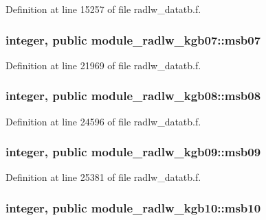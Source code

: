 Definition at line 15257 of file radlw\+\_\+datatb.\+f.

\subsubsection[{\texorpdfstring{msb07}{msb07}}]{\setlength{\rightskip}{0pt plus 5cm}integer, public module\+\_\+radlw\+\_\+kgb07\+::msb07}\hypertarget{group__module__radlw__main_gabba2139dfc5d8551f844f3809c28ce3c}{}\label{group__module__radlw__main_gabba2139dfc5d8551f844f3809c28ce3c}


Definition at line 21969 of file radlw\+\_\+datatb.\+f.

\subsubsection[{\texorpdfstring{msb08}{msb08}}]{\setlength{\rightskip}{0pt plus 5cm}integer, public module\+\_\+radlw\+\_\+kgb08\+::msb08}\hypertarget{group__module__radlw__main_ga3dd391fcce47d3aca3512bbfd946807b}{}\label{group__module__radlw__main_ga3dd391fcce47d3aca3512bbfd946807b}


Definition at line 24596 of file radlw\+\_\+datatb.\+f.

\subsubsection[{\texorpdfstring{msb09}{msb09}}]{\setlength{\rightskip}{0pt plus 5cm}integer, public module\+\_\+radlw\+\_\+kgb09\+::msb09}\hypertarget{group__module__radlw__main_ga7e6bb7acb0df29586d0bd52f3fc41d90}{}\label{group__module__radlw__main_ga7e6bb7acb0df29586d0bd52f3fc41d90}


Definition at line 25381 of file radlw\+\_\+datatb.\+f.

\subsubsection[{\texorpdfstring{msb10}{msb10}}]{\setlength{\rightskip}{0pt plus 5cm}integer, public module\+\_\+radlw\+\_\+kgb10\+::msb10}\hypertarget{group__module__radlw__main_gaf33570d793ca152588c14ce30ac30798}{}\label{group__module__radlw__main_gaf33570d793ca152588c14ce30ac30798}


